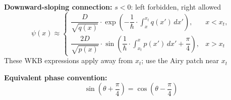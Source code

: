 \documentclass[12pt]{article}
\begin{document}
\textbf{Downward-sloping connection:}
$s<0$: left forbidden, right allowed
\[
  \psi(x)\approx\begin{cases}
    \dfrac{D}{\sqrt{q(x)}}\cdot\exp\left(
      -\dfrac1\hbar\cdot\int_{x}^{x_t}q(x')\,dx'\right),&x<x_t,\\[1em]
    \dfrac{2D}{\sqrt{p(x)}}\cdot\sin\left(
      \dfrac1\hbar\cdot\int_{x_t}^{x}p(x')\,dx'
      +\dfrac\pi4\right),&x>x_t
  \end{cases}
\]
These WKB expressions apply away from $x_t$; use the Airy patch near $x_t$

\textbf{Equivalent phase convention:}
\[
  \sin\left(\theta+\frac\pi4\right)=\cos\left(\theta-\frac\pi4\right)
\]
\end{document}
